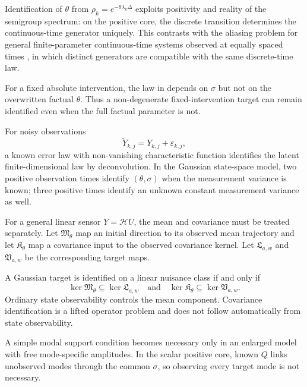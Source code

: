 \begin{remark}[No aliasing]\label{rem:no-aliasing}
Identification of $\theta$ from $\rho_k=e^{-\theta\lambda_k\Delta}$ exploits positivity and reality of the semigroup spectrum: on the positive core, the discrete transition determines the continuous-time generator uniquely. This contrasts with the aliasing problem for general finite-parameter continuous-time systems observed at equally spaced times \citep{Phillips1973,HansenSargent1983}, in which distinct generators are compatible with the same discrete-time law.
\end{remark}

For a fixed absolute intervention, the law in  depends on $\sigma$ but not on the overwritten factual $\theta$. Thus a non-degenerate fixed-intervention target can remain identified even when the full factual parameter is not.

For noisy observations
\[
 \widetilde Y_{k,j}=Y_{k,j}+\varepsilon_{k,j},
\]
a known error law with non-vanishing characteristic function identifies the latent finite-dimensional law by deconvolution. In the Gaussian state-space model, two positive observation times identify $(\theta,\sigma)$ when the measurement variance is known; three positive times identify an unknown constant measurement variance as well.

For a general linear sensor $Y=\mathcal HU$, the mean and covariance must be treated separately. Let $\mathfrak M_\theta$ map an initial direction to its observed mean trajectory and let $\mathfrak K_\theta$ map a covariance input to the observed covariance kernel. Let $\mathfrak L_{a,w}$ and $\mathfrak V_{a,w}$ be the corresponding target maps.

\begin{proposition}\label{prop:partial}
A Gaussian target is identified on a linear nuisance class if and only if
\[
 \ker\mathfrak M_\theta\subseteq\ker\mathfrak L_{a,w}
 \quad\text{and}\quad
 \ker\mathfrak K_\theta\subseteq\ker\mathfrak V_{a,w}.
\]
Ordinary state observability controls the mean component. Covariance identification is a lifted operator problem and does not follow automatically from state observability.
\end{proposition}

A simple modal support condition becomes necessary only in an enlarged model with free mode-specific amplitudes. In the scalar positive core, known $Q$ links unobserved modes through the common $\sigma$, so observing every target mode is not necessary.

